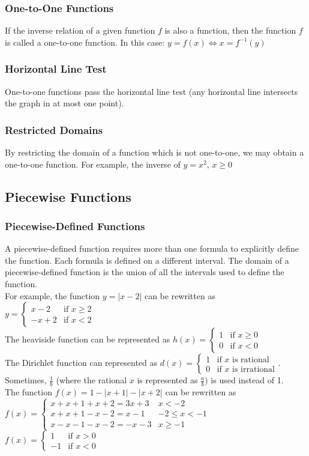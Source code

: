\documentclass{article}
\begin{document}
	\subsubsection{One-to-One Functions}
	If the inverse relation of a given function $f$ is also a function, then the function $f$ is called a one-to-one function. In this case: $y=f(x)\Leftrightarrow x=f^{-1}(y)$
	\subsubsection{Horizontal Line Test}
	One-to-one functions pass the horizontal line test (any horizontal line intersects the graph in at most one point).
	\subsubsection{Restricted Domains}
	By restricting the domain of a function which is not one-to-one, we may obtain a one-to-one function. For example, the inverse of $y=x^2\text{, }x\geqslant0$
	\subsection{Piecewise Functions}
	\subsubsection{Piecewise-Defined Functions}
	A piecewise-defined function requires more than one formula to explicitly define the function. Each formula is defined on a different interval. The domain of a piecewise-defined function is the union of all the intervals used to define the function.\\
	For example, the function $y=|x-2|$ can be rewritten as $y=\begin{cases}
		x-2&\text{if }x\geq2\\
		-x+2&\text{if }x<2
	\end{cases}$\\
	The heaviside function can be represented as $h(x)=\begin{cases}
		1&\text{if }x\geq0\\
		0&\text{if }x<0
	\end{cases}$\\
	The Dirichlet function can represented as $d(x)=\begin{cases}
		1&\text{if }x\text{ is rational}\\
		0&\text{if }x\text{ is irrational}
	\end{cases}$. Sometimes, $\frac{1}{b}$ (where the rational $x$ is represented as $\frac{a}{b}$) is used instead of 1.\\
	The function $f(x)=1-|x+1|-|x+2|$ can be rewritten as $f(x)=\begin{cases}
		x+x+1+x+2=3x+3&x<-2\\x+x+1-x-2=x-1&-2\leq x<-1\\x-x-1-x-2=-x-3&x\geq-1
	\end{cases}$\\
	$f(x)=\begin{cases}
		1&\text{if }x>0\\
		-1&\text{if }x<0
	\end{cases}$
	
\end{document}
